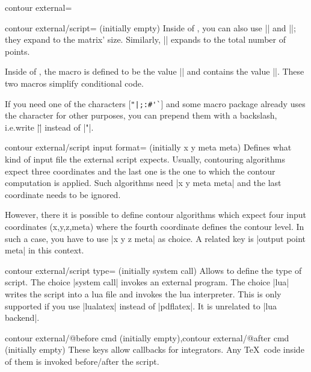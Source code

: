 {{\begin{plottype}[/pgfplots]{
    contour external=\textcolor{black}{}%
}
\begin{pgfplotskey}{contour external/script= (initially empty)}
        Inside of , you can also use
        || and
        ||; they expand to the matrix'
        size. Similarly, || expands
        to the total number of points.

        Inside of , the macro
        \declareandlabel{\thecontournumber} is defined to be the value
        || and
        \declareandlabel{\thecontourlevels} contains the value
        ||. These two macros simplify
        conditional code.

        If you need one of the characters [\verb!"|;:#'`!] and some macro
        package already uses the character for other purposes, you can prepend
        them with a backslash, i.e.\@ write |\"| instead of |"|.
    \end{pgfplotskey}

	\begin{pgfplotskey}{contour external/script input format= (initially x y meta meta)}
		Defines what kind of input file the external script expects. Usually, contouring algorithms expect three coordinates and the last one is the one to which the contour computation is applied. Such algorithms need |x y meta meta| and the last coordinate needs to be ignored.

		However, there it is possible to define contour algorithms which expect four input coordinates (x,y,z,meta) where the fourth coordinate defines the contour level. In such a case, you have to use |x y z meta| as choice. A related key is |output point meta| in this context.
	\end{pgfplotskey}

	\begin{pgfplotskey}{contour external/script type= (initially system call)}
		Allows to define the type of script. The choice |system call| invokes an external program. The choice |lua| writes the script into a lua file and invokes the lua interpreter. This is only supported if you use |lualatex| instead of |pdflatex|. It is unrelated to |lua backend|.
	\end{pgfplotskey}
	\begin{pgfplotskeylist}{contour external/@before cmd (initially empty),contour external/@after cmd (initially empty)}
		These keys allow callbacks for integrators. Any \TeX\ code inside of them is invoked before/after the script.
	\end{pgfplotskeylist}


\end{plottype}}}
